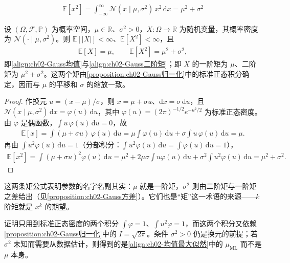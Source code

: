 \documentclass[../../main.tex]{subfiles}
\begin{document}
\begin{align}
  \mathbb{E}\left[x^{2}\right] = \int_{-\infty}^{\infty}\mathcal{N}(x\mid\mu,\sigma^{2})\,x^{2}\,\mathrm{d}x = \mu^{2}+\sigma^{2}
  \label{align:ch02-Gauss二阶矩}
\end{align}

\begin{proposition}\label{proposition:ch02-Gauss矩}
设 $(\Omega,\mathcal{F},\mathbb{P})$ 为概率空间，$\mu\in\mathbb{R}$、$\sigma^{2}>0$，$X:\Omega\to\mathbb{R}$ 为随机变量，其概率密度为 $\mathcal{N}(\cdot\mid\mu,\sigma^{2})$。则 $\mathbb{E}[|X|]<\infty$、$\mathbb{E}[X^{2}]<\infty$，且
\begin{align*}
  \mathbb{E}[X]=\mu,\qquad \mathbb{E}[X^{2}]=\mu^{2}+\sigma^{2},
\end{align*}
即\eqref{align:ch02-Gauss均值}与\eqref{align:ch02-Gauss二阶矩}；即 $X$ 的一阶矩为 $\mu$、二阶矩为 $\mu^{2}+\sigma^{2}$。这两个矩由\cref{proposition:ch02-Gauss归一化}中的标准正态积分确定，因而与 $\mu$ 的平移和 $\sigma$ 的缩放一致。
\end{proposition}

\begin{proof}
作换元 $u=(x-\mu)/\sigma$，则 $x=\mu+\sigma u$、$\mathrm{d}x=\sigma\,\mathrm{d}u$，且 $\mathcal{N}(x\mid\mu,\sigma^{2})\,\mathrm{d}x=\varphi(u)\,\mathrm{d}u$，其中 $\varphi(u)=(2\pi)^{-1/2}e^{-u^{2}/2}$ 为标准正态密度。由 $\varphi$ 是偶函数，$\int u\,\varphi(u)\,\mathrm{d}u=0$，故
\begin{align*}
 \mathbb{E}[x] = \int(\mu+\sigma u)\,\varphi(u)\,\mathrm{d}u = \mu\int\varphi(u)\,\mathrm{d}u + \sigma\int u\,\varphi(u)\,\mathrm{d}u = \mu .
\end{align*}
再由 $\int u^{2}\varphi(u)\,\mathrm{d}u=1$（分部积分：$\int u^{2}\varphi(u)\,\mathrm{d}u=\int\varphi(u)\,\mathrm{d}u=1$），
\begin{align*}
 \mathbb{E}[x^{2}] = \int(\mu+\sigma u)^{2}\varphi(u)\,\mathrm{d}u
 = \mu^{2} + 2\mu\sigma\int u\varphi(u)\,\mathrm{d}u + \sigma^{2}\int u^{2}\varphi(u)\,\mathrm{d}u = \mu^{2}+\sigma^{2} .
\end{align*}
\end{proof}

\begin{remark}
这两条矩公式表明参数的名字名副其实：$\mu$ 就是一阶矩，$\sigma^{2}$ 则由二阶矩与一阶矩之差给出（见\cref{proposition:ch02-Gauss方差}）。它们也是“矩”这一术语的来源——$k$ 阶矩就是 $x^{k}$ 的期望。

证明只用到标准正态密度的两个积分 $\int\varphi=1$、$\int u^{2}\varphi=1$，而这两个积分又依赖\cref{proposition:ch02-Gauss归一化}中的 $I=\sqrt{2\pi}$。条件 $\sigma^{2}>0$ 仍是换元的前提；若 $\sigma^{2}$ 未知而需要从数据估计，则得到的是\eqref{align:ch02-均值最大似然}中的 $\mu_{\mathrm{ML}}$ 而不是 $\mu$ 本身。
\end{remark}
\end{document}
